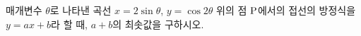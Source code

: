 매개변수 $\theta$로 나타낸 곡선 $x=2\sin\theta$, $y=\cos 2\theta$ 위의 점 $\mathrm{P}$에서의 접선의 방정식을 $y=ax+b$라 할 때, $a+b$의 최솟값을 구하시오.
